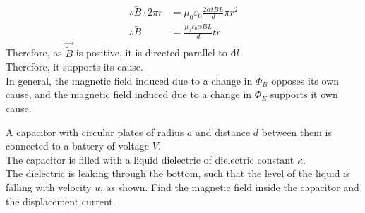 \documentclass[fleqn, a4paper, 8pt, twoside]{amsart}
\theoremstyle{definition}
\theoremstyle{theorem}
\begin{document}
\begin{multicols}{2}
\begin{spacing}{0.6}
\begin{solution}
\begin{align*}
		\therefore \tilde{B} \cdot 2 \pi r                     & = \mu_0 \varepsilon_0 \frac{2 \alpha t B L}{d} \pi r^2                                                                                                             \\
		\therefore \tilde{B}                                   & = \frac{\mu_0 \varepsilon_0 \alpha B L}{d} t r
	\end{align*}
	Therefore, as $\overrightarrow{\tilde{B}}$ is positive, it is directed parallel to $\dif l$.\\
	Therefore, it supports its cause.\\
	In general, the magnetic field induced due to a change in $\Phi_B$ opposes its own cause, and the magnetic field induced due to a change in $\Phi_E$ supports it own cause.
\end{solution}

\begin{question}
	A capacitor with circular plates of radius $a$ and distance $d$ between them is connected to a battery of voltage $V$.\\
	The capacitor is filled with a liquid dielectric of dielectric constant $\kappa$.\\
	The dielectric is leaking through the bottom, such that the level of the liquid is falling with velocity $u$, as shown.
	Find the magnetic field inside the capacitor and the displacement current.
	\begin{figure}[H]
	\end{figure}
\end{question}


\end{spacing}
\end{multicols}
\end{document}
